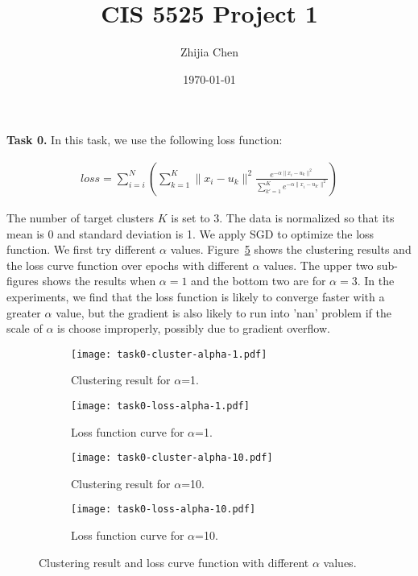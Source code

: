 \documentclass{article}
\title{CIS 5525 Project 1}
\author{Zhijia Chen}
\date{\today}
\begin{document}
\begin{titlepage}
    \maketitle
\end{titlepage}

\textbf{Task 0.}
\vspace{\baselineskip}
In this task, we use the following loss function:

\begin{align*}
    loss = \sum_{i=i}^{N}{\left(\sum_{k=1}^{K}\|x_i-u_k\|^2\frac{e^{-\alpha\|x_i-u_k\|^2}}{\sum_{k'=1}^{K}e^{-\alpha\|x_i-u_{k'}\|^2}}\right)}
\end{align*}

The number of target clusters $K$ is set to 3. The data is normalized so that its mean is 0 and standard deviation is 1. We apply SGD to optimize the loss function. We first try different $\alpha$ values. Figure~\ref{fig:task0} shows the clustering results and the loss curve function over epochs with different $\alpha$ values. The upper two sub-figures shows the results when $\alpha=1$ and the bottom two are for $\alpha=3$. In the experiments, we find that the loss function is likely to converge faster with a greater $\alpha$ value, but the gradient is also likely to run into 'nan' problem if the scale of $\alpha$ is choose improperly, possibly due to gradient overflow.  
\begin{figure}[h!]
    \centering
    \begin{subfigure}{.33\textwidth}
      \centering
      \texttt{[image: task0-cluster-alpha-1.pdf]}
      \caption{Clustering result for $\alpha$=1.}
      \label{fig:cluster1}
    \end{subfigure}%
    \begin{subfigure}{.66\textwidth}
      \centering
      \texttt{[image: task0-loss-alpha-1.pdf]}
      \caption{Loss function curve for $\alpha$=1.}
      \label{fig:loss1}
    \end{subfigure}
    \centering
    \begin{subfigure}{.33\textwidth}
      \centering
      \texttt{[image: task0-cluster-alpha-10.pdf]}
      \caption{Clustering result for $\alpha$=10.}
      \label{fig:cluster10}
    \end{subfigure}%
    \begin{subfigure}{.66\textwidth}
      \centering
      \texttt{[image: task0-loss-alpha-10.pdf]}
      \caption{Loss function curve for $\alpha$=10.}
      \label{fig:loss10}
    \end{subfigure}
    \caption{Clustering result and loss curve function with different $\alpha$ values.}
    \label{fig:task0}
\end{figure}
\end{document}
